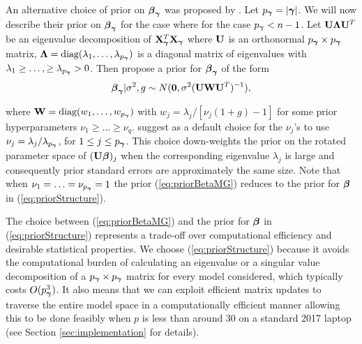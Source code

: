 \documentclass{article}[12pt]
\begin{document}
An alternative choice of prior on ${\boldsymbol \beta}_{\boldsymbol \gamma}$ was proposed by \cite{Maruyama2011}. Let
$p_{{\boldsymbol \gamma}} = |{\boldsymbol \gamma}|$. We will now describe their prior on ${\boldsymbol \beta}_{\boldsymbol \gamma}$ for the case where for the case
$p_{{\boldsymbol \gamma}} < n - 1$. Let ${\bf U}{\boldsymbol \Lambda}{\bf U}^T$ be an eigenvalue decomposition of ${\bf X}_{\boldsymbol \gamma}^T{\bf X}_{\boldsymbol \gamma}$
where ${\bf U}$ is an orthonormal $p_{{\boldsymbol \gamma}} \times p_{{\boldsymbol \gamma}}$ matrix, ${\boldsymbol \Lambda} = \mbox{diag}(\lambda_1,\ldots,\lambda_{p_{{\boldsymbol \gamma}}})$ 
is a diagonal matrix of eigenvalues with $\lambda_1\ge\ldots,\ge \lambda_{p_{{\boldsymbol \gamma}}}>0$. Then \cite{Maruyama2011} 
propose a prior for ${\boldsymbol \beta}_{\boldsymbol \gamma}$ of the form
\begin{equation}
\label{eq:priorBetaMG}
{\boldsymbol\beta}_{\boldsymbol \gamma} | \sigma^2, g \sim N({\bf 0}, \sigma^2 ({\bf U}{\bf W}{\bf U}^T)^{-1}),   
\end{equation} 

\noindent where ${\bf W} = \mbox{diag}(w_1,\ldots,w_{p_{{\boldsymbol \gamma}}})$ with $ w_j = \lambda_j/[\nu_j(1 + g) - 1]$ for 
some prior hyperparameters $\nu_1 \ge \ldots \ge \nu_q$. \cite{Maruyama2011} suggest as a default 
choice for the $\nu_j$'s to use $\nu_j = \lambda_j/\lambda_{p_{{\boldsymbol \gamma}}}$, for $1\le j \le p_{{\boldsymbol \gamma}}$. 
This choice down-weights the prior on the rotated parameter space of $({\bf U} {\boldsymbol \beta})_j$ when the 
corresponding eigenvalue $\lambda_j$ is large and consequently prior standard errors are 
approximately the same size. Note that when $\nu_1 = \ldots = \nu_{p_{{\boldsymbol \gamma}}} = 1$ the prior 
(\ref{eq:priorBetaMG}) reduces to the prior for ${\boldsymbol \beta}$ in (\ref{eq:priorStructure}). 

The choice between (\ref{eq:priorBetaMG}) and the prior for ${\boldsymbol \beta}$ in (\ref{eq:priorStructure}) 
represents a trade-off over computational efficiency and desirable statistical properties. We choose
(\ref{eq:priorStructure}) because it avoids the computational burden of calculating an eigenvalue or a singular 
value decomposition of a $p_{{\boldsymbol \gamma}}\times p_{{\boldsymbol \gamma}}$ matrix for every model considered,
which typically costs $O(p_{{\boldsymbol \gamma}}^3)$. 
It also means that we can 
exploit efficient matrix updates to traverse the entire model space in a computationally efficient 
manner allowing this to be done feasibly when $p$ is less than around 30 on a standard 2017 laptop 
(see Section \ref{sec:implementation} for details).
\end{document}

